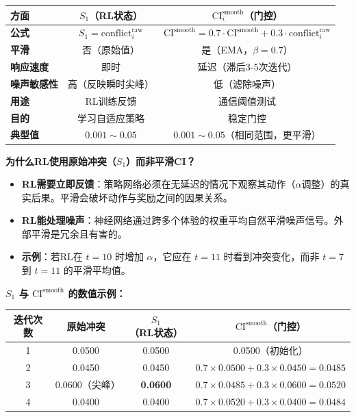 \documentclass[11pt,a3paper]{ctexart}
\begin{document}
\begin{center}
\begin{tabular}{|l|c|c|}
\hline
\textbf{方面} & \textbf{$S_1$（RL状态）} & \textbf{$\text{CI}_i^{\text{smooth}}$（门控）} \\
\hline
\textbf{公式} & $S_1 = \text{conflict}_i^{\text{raw}}$ & $\text{CI}^{\text{smooth}} = 0.7 \cdot \text{CI}^{\text{smooth}} + 0.3 \cdot \text{conflict}_i^{\text{raw}}$ \\
\hline
\textbf{平滑} & 否（原始值） & 是（EMA，$\beta=0.7$） \\
\hline
\textbf{响应速度} & 即时 & 延迟（滞后3-5次迭代） \\
\hline
\textbf{噪声敏感性} & 高（反映瞬时尖峰） & 低（滤除噪声） \\
\hline
\textbf{用途} & RL训练反馈 & 通信阈值测试 \\
\hline
\textbf{目的} & 学习自适应策略 & 稳定门控 \\
\hline
\textbf{典型值} & $0.001 \sim 0.05$ & $0.001 \sim 0.05$（相同范围，更平滑） \\
\hline
\end{tabular}
\end{center}

\textbf{为什么RL使用原始冲突（$S_1$）而非平滑CI？}

\begin{itemize}
    \item \textbf{RL需要立即反馈}：策略网络必须在无延迟的情况下观察其动作（$\alpha$调整）的真实后果。平滑会破坏动作与奖励之间的因果关系。
    \item \textbf{RL能处理噪声}：神经网络通过跨多个体验的权重平均自然平滑噪声信号。外部平滑是冗余且有害的。
    \item \textbf{示例}：若RL在 $t=10$ 时增加 $\alpha$，它应在 $t=11$ 时看到冲突变化，而非 $t=7$ 到 $t=11$ 的平滑平均值。
\end{itemize}

\textbf{$S_1$ 与 $\text{CI}^{\text{smooth}}$ 的数值示例：}

\begin{center}
\begin{tabular}{|c|c|c|c|}
\hline
\textbf{迭代次数} & \textbf{原始冲突} & \textbf{$S_1$（RL状态）} & \textbf{$\text{CI}^{\text{smooth}}$（门控）} \\
\hline
1 & 0.0500 & 0.0500 & 0.0500（初始化） \\
2 & 0.0450 & 0.0450 & $0.7 \times 0.0500 + 0.3 \times 0.0450 = 0.0485$ \\
3 & 0.0600（尖峰） & \textbf{0.0600} & $0.7 \times 0.0485 + 0.3 \times 0.0600 = 0.0520$ \\
4 & 0.0400 & 0.0400 & $0.7 \times 0.0520 + 0.3 \times 0.0400 = 0.0484$ \\
\hline
\end{tabular}
\end{center}
\end{document}
